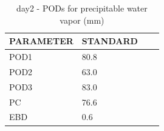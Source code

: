 \begin{table}[p!]
\begin{center}
\begin{tabular}{|l|l|l|l|}
\hline
\multicolumn{1}{|c|}{\cellcolor[HTML]{C0C0C0}\textbf{PARAMETER}} & \multicolumn{1}{c|}{\cellcolor[HTML]{C0C0C0}\textbf{STANDARD}} \\
\hline
\cellcolor[HTML]{C0C0C0}POD1  & 80.8                                \\
\cellcolor[HTML]{C0C0C0}POD2  & 63.0                                \\
\cellcolor[HTML]{C0C0C0}POD3  & 83.0                                \\
\cellcolor[HTML]{C0C0C0}PC    & 76.6                                  \\
\cellcolor[HTML]{C0C0C0}EBD   & 0.6                                 \\
\hline
\end{tabular}
\caption{day2 - PODs for precipitable water vapor (mm)}
\label{tab:podpwv:day2}
\end{center}
\end{table}
